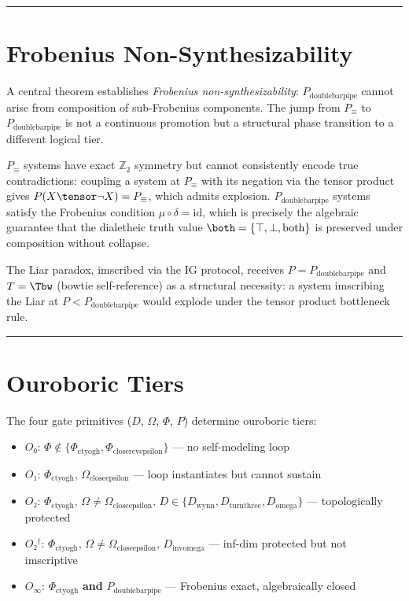 \documentclass[12pt,a4paper]{article}
\newcommand{\Ppms}{P_{\text{doublebarpipe}}}
\begin{document}
\begin{center}
\rule{0.5\textwidth}{0.4pt}
\end{center}

\section{Frobenius Non-Synthesizability}

A central theorem establishes \emph{Frobenius non-synthesizability}: $\Ppms$ cannot arise from composition of sub-Frobenius components. The jump from $P_\equiv$ to $\Ppms$ is not a continuous promotion but a structural phase transition to a different logical tier.

$P_\equiv$ systems have exact $\mathbb{Z}_2$ symmetry but cannot consistently encode true contradictions: coupling a system at $P_\equiv$ with its negation via the tensor product gives $P(X \tensor \neg X) = P_\equiv$, which admits explosion. $\Ppms$ systems satisfy the Frobenius condition $\mu \circ \delta = \text{id}$, which is precisely the algebraic guarantee that the dialetheic truth value $\both = \{\top, \bot, \text{both}\}$ is preserved under composition without collapse.

The Liar paradox, imscribed via the IG protocol, receives $P = \Ppms$ and $T = \Tbw$ (bowtie self-reference) as a structural necessity: a system imscribing the Liar at $P < \Ppms$ would explode under the tensor product bottleneck rule.

\begin{center}
\rule{0.5\textwidth}{0.4pt}
\end{center}

\section{Ouroboric Tiers}

The four gate primitives ($D$, $\Omega$, $\Phi$, $P$) determine ouroboric tiers:
\begin{itemize}
    \item $O₀$: $\Phi \notin \{\Phi_{\text{ctyogh}}, \Phi_{\text{closerevepsilon}}\}$ --- no self-modeling loop
    \item $O₁$: $\Phi_{\text{ctyogh}}$, $\Omega_{\text{closeepsilon}}$ --- loop instantiates but cannot sustain
    \item $O₂$: $\Phi_{\text{ctyogh}}$, $\Omega \neq \Omega_{\text{closeepsilon}}$, $D \in \{D_{\text{wynn}}, D_{\text{turnthree}}, D_{\text{omega}}\}$ --- topologically protected
    \item $O₂^\dagger$: $\Phi_{\text{ctyogh}}$, $\Omega \neq \Omega_{\text{closeepsilon}}$, $D_{\text{invomega}}$ --- inf-dim protected but not imscriptive
    \item $O_\infty$: $\Phi_{\text{ctyogh}}$ \textbf{and} $\Ppms$ --- Frobenius exact, algebraically closed
\end{itemize}
\end{document}
